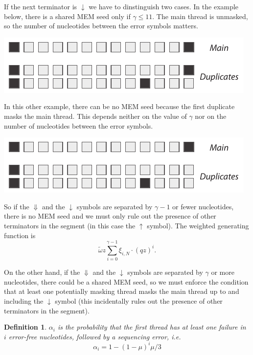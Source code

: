 \documentclass{article}
\newtheorem{definition}{Definition}
\newenvironment{inset}
{\vspace{0.5\baselineskip}\begin{center}}
{\end{center}\vspace{0.5\baselineskip}}
\begin{document}
If the next terminator is $\downarrow$ we have to dinstinguish two cases.
In the example below, there is a shared MEM seed only if $\gamma \leq
11$. The main thread is unmasked, so the number of nucleotides between the
error symbols matters.
\begin{inset}
\includegraphics[scale=.9]{ddown_to_down_case_1.pdf}
\end{inset}
In this other example, there can be no MEM seed because the first
duplicate masks the main thread. This depends neither on the value of
$\gamma$ nor on the number of nucleotides between the error symbols.
\begin{inset}
\includegraphics[scale=.9]{ddown_to_down_case_2.pdf}
\end{inset}

So if the $\Downarrow$ and the $\downarrow$ symbols are separated by
$\gamma-1$ or fewer nucleotides, there is no MEM seed and we must only
rule out the presence of other terminators in the segment (in this case
the $\uparrow$ symbol). The weighted generating function is
\begin{equation}
\tilde{\omega} z \sum_{i=0}^{\gamma-1} \xi_{i,N} \cdot (qz)^i.
\end{equation}

On the other hand, if the $\Downarrow$ and the $\downarrow$ symbols are
separated by $\gamma$ or more nucleotides, there could be a shared MEM
seed, so we must enforce the condition that at least one potentially
masking thread masks the main thread up to and including the $\downarrow$
symbol (this incidentally rules out the presence of other terminators in
the segment).

\begin{definition}
$\alpha_i$ is the probability that the first thread has at least one
failure in $i$ error-free nucleotides, followed by a sequencing error,
\textit{i.e.}
\begin{equation}
\alpha_i = 1 - (1-\mu)^i\mu/3
\end{equation}
\end{definition}
\end{document}
